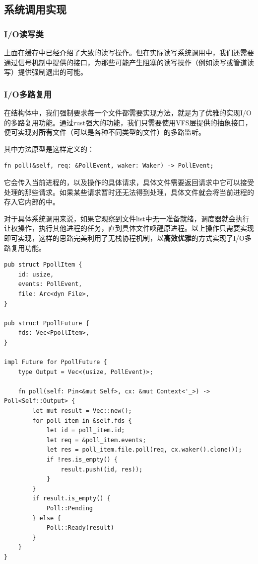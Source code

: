 \documentclass{article}
\begin{document}
\subsection{系统调用实现}
\subsubsection{I/O读写类}
上面在缓存中已经介绍了大致的读写操作。但在实际读写系统调用中，我们还需要通过信号机制中提供的接口，为那些可能产生阻塞的读写操作（例如读写或管道读写）提供强制退出的可能。
\subsubsection{I/O多路复用}
在结构体中，我们强制要求每一个文件都需要实现方法，就是为了优雅的实现I/O的多路复用功能。通过rust强大的功能，我们只需要使用VFS层提供的抽象接口，便可实现对\textbf{所有}文件（可以是各种不同类型的文件）的多路监听。

其中方法原型是这样定义的：
\begin{lstlisting}
fn poll(&self, req: &PollEvent, waker: Waker) -> PollEvent;
\end{lstlisting}
它会传入当前进程的，以及操作的具体请求，具体文件需要返回请求中它可以接受处理的那些请求。如果某些请求暂时还无法得到处理，具体文件就会将当前进程的存入它内部的中。

对于具体系统调用来说，如果它观察到文件list中无一准备就绪，调度器就会执行让权操作，执行其他进程的任务，直到具体文件唤醒原进程。以上操作只需要实现即可实现，这样的思路完美利用了无栈协程机制，以\textbf{高效优雅}的方式实现了I/O多路复用功能。

\begin{lstlisting}
pub struct PpollItem {
    id: usize,
    events: PollEvent,
    file: Arc<dyn File>,
}

pub struct PpollFuture {
    fds: Vec<PpollItem>,
}

impl Future for PpollFuture {
    type Output = Vec<(usize, PollEvent)>;

    fn poll(self: Pin<&mut Self>, cx: &mut Context<'_>) -> Poll<Self::Output> {
        let mut result = Vec::new();
        for poll_item in &self.fds {
            let id = poll_item.id;
            let req = &poll_item.events;
            let res = poll_item.file.poll(req, cx.waker().clone());
            if !res.is_empty() {
                result.push((id, res));
            }
        }
        if result.is_empty() {
            Poll::Pending
        } else {
            Poll::Ready(result)
        }
    }
}
\end{lstlisting}
\end{document}
